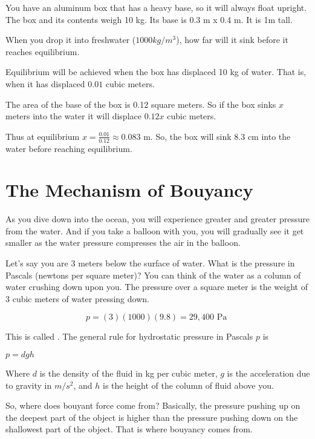 \begin{Exercise}[title={Bouyancy}, label=bouyancy]
  You have an aluminum box that has a heavy base, so it will always
  float upright. The box and its contents weigh 10 kg. Its base is 0.3 m x 0.4 m. It is 1m tall.

  When you drop it into freshwater ($1000 kg/m^3$), how far will it sink
  before it reaches equilibrium.
  
\end{Exercise}
\begin{Answer}[ref=bouyancy]
  Equilibrium will be achieved when the box has displaced 10 kg of water. That is, when it has displaced $0.01$ cubic meters.

  The area of the base of the box is 0.12 square meters.  So if the
  box sinks $x$ meters into the water it will displace $0.12 x$ cubic
  meters.

  Thus at equilibrium $x = \frac{0.01}{0.12} \approx 0.083$ m.  So,
  the box will sink 8.3 cm into the water before reaching equilibrium.
\end{Answer}

\section{The Mechanism of Bouyancy}

As you dive down into the ocean, you will experience greater and
greater pressure from the water. And if you take a balloon with you, you
will gradually see it get smaller as the water pressure compresses the
air in the balloon.

Let's say you are 3 meters below the surface of water. What is the
pressure in Pascals (newtons per square meter)? You can think of the
water as a column of water crushing down upon you. The pressure over
a square meter is the weight of 3 cubic meters of water pressing down.

$$p = (3)(1000)(9.8) = 29,400 \text{ Pa }$$

This is called . The general rule for
hydrostatic pressure in Pascals $p$ is

$p = d g h$

Where  $d$ is the density of the fluid
in kg per cubic meter, $g$ is the acceleration due to gravity in
$m/s^2$, and $h$ is the height of the column of fluid above you.

So, where does bouyant force come from? Basically, the pressure pushing up on the
deepest part of the object is higher than the pressure pushing down on
the shallowest part of the object. That is where bouyancy comes from.

